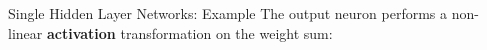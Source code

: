 \begin{frame} {Single Hidden Layer Networks: Example}
The output neuron performs a non-linear \textbf{activation} transformation on the weight sum:
\begin{figure}
\centering
{}
\end{figure}
\end{frame}



